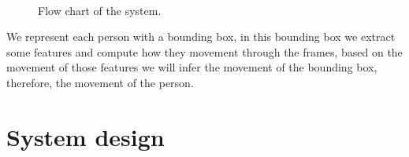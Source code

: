 \begin{figure}[H]
	
\centering

\\


\caption{Flow chart of the system.}
\label{introTracking3}
\end{figure}

We represent each person with a bounding box, in this bounding box we extract some features and compute how they movement through the frames, based on the movement of those features we will infer the movement of the bounding box, therefore, the movement of the person.

\section{System design}

